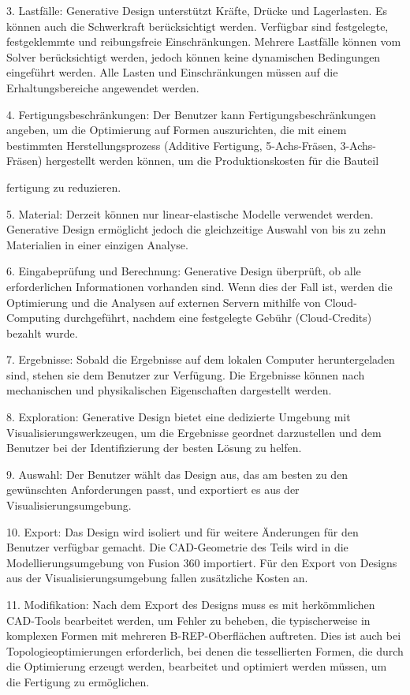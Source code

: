 3. Lastfälle: Generative Design unterstützt Kräfte, Drücke und Lagerlasten. Es können auch die Schwerkraft berücksichtigt werden. Verfügbar sind festgelegte, festgeklemmte und reibungsfreie Einschränkungen. Mehrere Lastfälle können vom Solver berücksichtigt werden, jedoch können keine dynamischen Bedingungen eingeführt werden. Alle Lasten und Einschränkungen müssen auf die Erhaltungsbereiche angewendet werden.

4. Fertigungsbeschränkungen: Der Benutzer kann Fertigungsbeschränkungen angeben, um die Optimierung auf Formen auszurichten, die mit einem bestimmten Herstellungsprozess (Additive Fertigung, 5-Achs-Fräsen, 3-Achs-Fräsen) hergestellt werden können, um die Produktionskosten für die Bauteil

fertigung zu reduzieren.

5. Material: Derzeit können nur linear-elastische Modelle verwendet werden. Generative Design ermöglicht jedoch die gleichzeitige Auswahl von bis zu zehn Materialien in einer einzigen Analyse.

6. Eingabeprüfung und Berechnung: Generative Design überprüft, ob alle erforderlichen Informationen vorhanden sind. Wenn dies der Fall ist, werden die Optimierung und die Analysen auf externen Servern mithilfe von Cloud-Computing durchgeführt, nachdem eine festgelegte Gebühr (Cloud-Credits) bezahlt wurde.

7. Ergebnisse: Sobald die Ergebnisse auf dem lokalen Computer heruntergeladen sind, stehen sie dem Benutzer zur Verfügung. Die Ergebnisse können nach mechanischen und physikalischen Eigenschaften dargestellt werden.

8. Exploration: Generative Design bietet eine dedizierte Umgebung mit Visualisierungswerkzeugen, um die Ergebnisse geordnet darzustellen und dem Benutzer bei der Identifizierung der besten Lösung zu helfen.

9. Auswahl: Der Benutzer wählt das Design aus, das am besten zu den gewünschten Anforderungen passt, und exportiert es aus der Visualisierungsumgebung.

10. Export: Das Design wird isoliert und für weitere Änderungen für den Benutzer verfügbar gemacht. Die \ac*{CAD}-Geometrie des Teils wird in die Modellierungsumgebung von Fusion 360 importiert. Für den Export von Designs aus der Visualisierungsumgebung fallen zusätzliche Kosten an.

11. Modifikation: Nach dem Export des Designs muss es mit herkömmlichen \ac*{CAD}-Tools bearbeitet werden, um Fehler zu beheben, die typischerweise in komplexen Formen mit mehreren B-REP-Oberflächen auftreten. Dies ist auch bei Topologieoptimierungen erforderlich, bei denen die tessellierten Formen, die durch die Optimierung erzeugt werden, bearbeitet und optimiert werden müssen, um die Fertigung zu ermöglichen.

